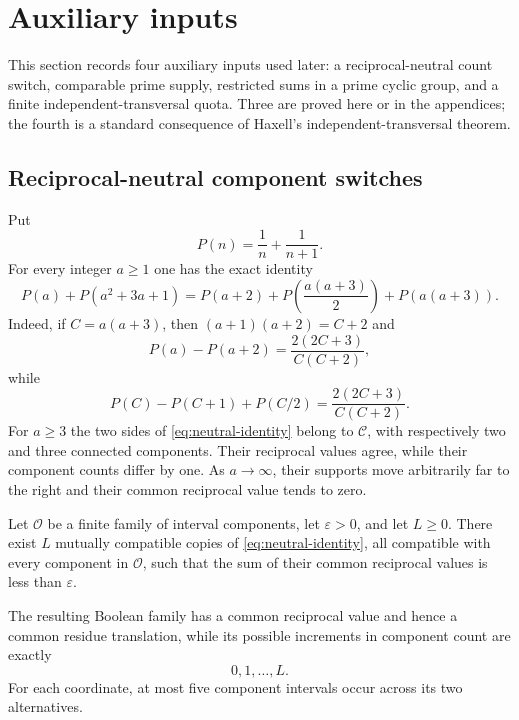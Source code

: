 \section{Auxiliary inputs}
\label{sec:auxiliary-inputs}

This section records four auxiliary inputs used later: a reciprocal-neutral count switch, comparable prime supply, restricted sums in a prime cyclic group, and a finite independent-transversal quota.  Three are proved here or in the appendices; the fourth is a standard consequence of Haxell's independent-transversal theorem.

\subsection{Reciprocal-neutral component switches}

Put
\[
P(n)=\frac1n+\frac1{n+1}.
\]
For every integer $a\ge1$ one has the exact identity
\begin{equation}\label{eq:neutral-identity}
P(a)+P(a^2+3a+1)
=
P(a+2)+P\!\left(\frac{a(a+3)}2\right)+P(a(a+3)).
\end{equation}
Indeed, if $C=a(a+3)$, then $(a+1)(a+2)=C+2$ and
\[
P(a)-P(a+2)=\frac{2(2C+3)}{C(C+2)},
\]
while
\[
P(C)-P(C+1)+P(C/2)=\frac{2(2C+3)}{C(C+2)}.
\]
For $a\ge3$ the two sides of \eqref{eq:neutral-identity} belong to $\mathcal C$, with respectively two and three connected components.  Their reciprocal values agree, while their component counts differ by one.  As $a\to\infty$, their supports move arbitrarily far to the right and their common reciprocal value tends to zero.

\begin{lemma}\label{lem:neutral-cube}
Let $\mathcal O$ be a finite family of interval components, let $\varepsilon>0$, and let $L\ge0$.  There exist $L$ mutually compatible copies of \eqref{eq:neutral-identity}, all compatible with every component in $\mathcal O$, such that the sum of their common reciprocal values is less than $\varepsilon$.

The resulting Boolean family has a common reciprocal value and hence a common residue translation, while its possible increments in component count are exactly
\[
0,1,\ldots,L.
\]
For each coordinate, at most five component intervals occur across its two alternatives.
\end{lemma}

